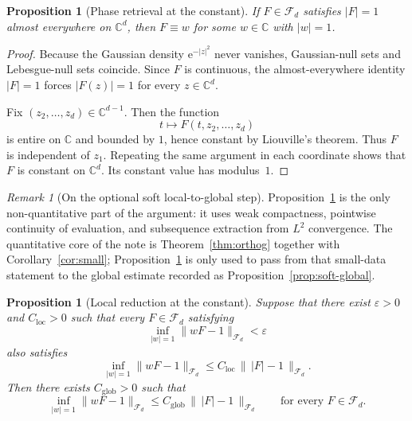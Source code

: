 \documentclass[11pt]{amsart}
\newtheorem{proposition}[theorem]{Proposition}
\theoremstyle{remark}
\newtheorem{remark}[theorem]{Remark}
\newcommand{\C}{\mathbb{C}}
\newcommand{\abs}[1]{\lvert #1 \rvert}
\newcommand{\norm}[1]{\lVert #1 \rVert}
\newcommand{\ee}{\mathrm{e}}
\newcommand{\Fd}{\mathcal{F}_d}
\begin{document}
\begin{proposition}[Phase retrieval at the constant]\label{prop:phase-at-one}
If $F \in \Fd$ satisfies $\abs{F}=1$ almost everywhere on $\C^d$, then
$F \equiv w$ for some $w \in \C$ with $\abs{w}=1$.
\end{proposition}

\begin{proof}
Because the Gaussian density $\ee^{-\abs{z}^2}$ never vanishes,
Gaussian-null sets and Lebesgue-null sets coincide.  Since $F$ is
continuous, the almost-everywhere identity $\abs{F}=1$ forces
$\abs{F(z)}=1$ for every $z \in \C^d$.

Fix $(z_2,\dots,z_d) \in \C^{d-1}$.  Then the function
\[
t \mapsto F(t,z_2,\dots,z_d)
\]
is entire on $\C$ and bounded by $1$, hence constant by Liouville's
theorem.  Thus $F$ is independent of $z_1$.  Repeating the same argument in
each coordinate shows that $F$ is constant on $\C^d$.  Its constant value
has modulus~$1$.
\end{proof}

\begin{remark}[On the optional soft local-to-global step]
Proposition~\ref{prop:local-reduction} is the only non-quantitative part of
the argument: it uses weak compactness, pointwise continuity of evaluation,
and subsequence extraction from $L^2$ convergence.  The quantitative core of
the note is Theorem~\ref{thm:orthog} together with
Corollary~\ref{cor:small}; Proposition~\ref{prop:local-reduction} is only
used to pass from that small-data statement to the global estimate recorded
as Proposition~\ref{prop:soft-global}.
\end{remark}

\begin{proposition}[Local reduction at the constant]\label{prop:local-reduction}
Suppose that there exist $\varepsilon > 0$ and $C_{\mathrm{loc}} > 0$ such
that every $F \in \Fd$ satisfying
\[
\inf_{\abs{w}=1}\norm{wF - 1}_{\Fd} < \varepsilon
\]
also satisfies
\[
\inf_{\abs{w}=1}\norm{wF - 1}_{\Fd}
\le
C_{\mathrm{loc}}\,\bigl\|\, \abs{F} - 1 \,\bigr\|_{\Fd}.
\]
Then there exists $C_{\mathrm{glob}} > 0$ such that
\[
\inf_{\abs{w}=1}\norm{wF - 1}_{\Fd}
\le
C_{\mathrm{glob}}\,\bigl\|\, \abs{F} - 1 \,\bigr\|_{\Fd}
\qquad
\text{for every } F \in \Fd.
\]
\end{proposition}
\end{document}
